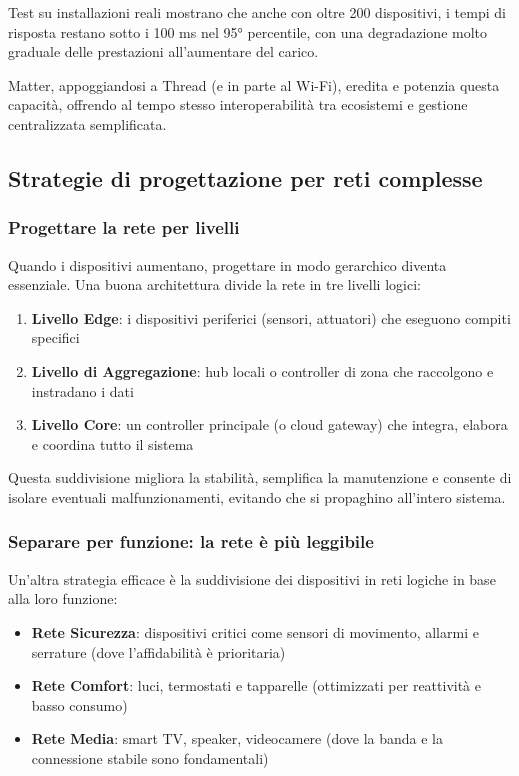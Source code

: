 Test su installazioni reali mostrano che anche con oltre 200 dispositivi, i tempi di risposta restano sotto i 100 ms nel 95° percentile, con una degradazione molto graduale delle prestazioni all’aumentare del carico.

Matter, appoggiandosi a Thread (e in parte al Wi-Fi), eredita e potenzia questa capacità, offrendo al tempo stesso interoperabilità tra ecosistemi e gestione centralizzata semplificata.

\subsection{Strategie di progettazione per reti complesse}

\subsubsection{Progettare la rete per livelli}

Quando i dispositivi aumentano, progettare in modo gerarchico diventa essenziale. Una buona architettura divide la rete in tre livelli logici:

\begin{enumerate}
    \item \textbf{Livello Edge}: i dispositivi periferici (sensori, attuatori) che eseguono compiti specifici
    \item \textbf{Livello di Aggregazione}: hub locali o controller di zona che raccolgono e instradano i dati
    \item \textbf{Livello Core}: un controller principale (o cloud gateway) che integra, elabora e coordina tutto il sistema
\end{enumerate}

Questa suddivisione migliora la stabilità, semplifica la manutenzione e consente di isolare eventuali malfunzionamenti, evitando che si propaghino all’intero sistema.

\subsubsection{Separare per funzione: la rete è più leggibile}

Un'altra strategia efficace è la suddivisione dei dispositivi in reti logiche in base alla loro funzione:

\begin{itemize}
    \item \textbf{Rete Sicurezza}: dispositivi critici come sensori di movimento, allarmi e serrature (dove l'affidabilità è prioritaria)
    \item \textbf{Rete Comfort}: luci, termostati e tapparelle (ottimizzati per reattività e basso consumo)
    \item \textbf{Rete Media}: smart TV, speaker, videocamere (dove la banda e la connessione stabile sono fondamentali)
\end{itemize}

